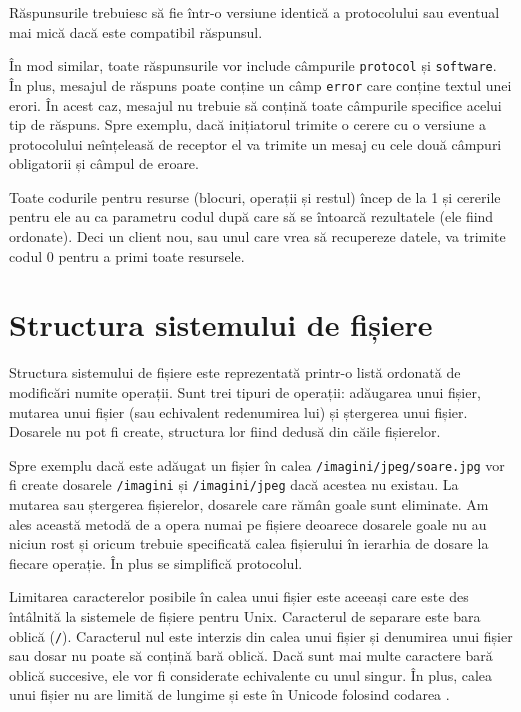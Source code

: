 \documentclass[a4wide,12pt]{report}
\newcommand{\cod}[1]{\texttt{#1}}
\newcommand{\acr}[1]{{\textsmaller[1]{\textsc{#1}}}} %
\begin{document}
Răspunsurile trebuiesc să fie într-o versiune identică a protocolului sau eventual mai mică dacă este compatibil
răspunsul.

În mod similar, toate răspunsurile vor include câmpurile \cod{protocol} și \cod{software}. În plus, mesajul de răspuns
poate conține un câmp \cod{error} care conține textul unei erori. În acest caz, mesajul nu trebuie să conțină toate
câmpurile specifice acelui tip de răspuns. Spre exemplu, dacă inițiatorul trimite o cerere cu o versiune a protocolului
neînțeleasă de receptor el va trimite un mesaj cu cele două câmpuri obligatorii și câmpul de eroare.

Toate codurile pentru resurse (blocuri, operații și restul) încep de la 1 și cererile pentru ele au ca parametru codul
după care să se întoarcă rezultatele (ele fiind ordonate). Deci un client nou, sau unul care vrea să recupereze datele,
va trimite codul 0 pentru a primi toate resursele.

\section{Structura sistemului de fișiere} %

Structura sistemului de fișiere este reprezentată printr-o listă ordonată de modificări numite operații. Sunt trei
tipuri de operații: adăugarea unui fișier, mutarea unui fișier (sau echivalent redenumirea lui) și ștergerea unui
fișier. Dosarele nu pot fi create, structura lor fiind dedusă din căile fișierelor. 

Spre exemplu dacă este adăugat un fișier în calea \cod{/imagini/jpeg/soare.jpg} vor fi create dosarele \cod{/imagini} și
\cod{/imagini/jpeg} dacă acestea nu existau. La mutarea sau ștergerea fișierelor, dosarele care rămân goale sunt
eliminate. Am ales această metodă de a opera numai pe fișiere deoarece dosarele goale nu au niciun rost și oricum
trebuie specificată calea fișierului în ierarhia de dosare la fiecare operație. În plus se simplifică protocolul.

Limitarea caracterelor posibile în calea unui fișier este aceeași care este des întâlnită la sistemele de fișiere pentru
Unix. Caracterul de separare este bara oblică (\cod{/}). Caracterul nul este interzis din calea unui fișier și denumirea
unui fișier sau dosar nu poate să conțină bară oblică. Dacă sunt mai multe caractere bară oblică succesive, ele vor fi
considerate echivalente cu unul singur. În plus, calea unui fișier nu are limită de lungime și este în Unicode folosind
codarea \acr{UTF-8}.
\end{document}
